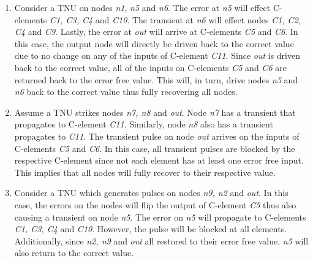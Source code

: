 \begin{enumerate}
	\item Consider a TNU on nodes \textit{n1}, \textit{n5} and \textit{n6}. The error at \textit{n5} will effect C-elements \textit{C1, C3, C4} and \textit{C10}. The transient at \textit{n6} will effect nodes \textit{C1, C2, C4} and \textit{C9}. Lastly, the error at \textit{out} will arrive at C-elements \textit{C5} and \textit{C6}. In this case, the output node will directly be driven back to the correct value due to no change on any of the inputs of C-element \textit{C11}. Since \textit{out} is driven back to the correct value, all of the inputs on C-elements \textit{C5} and \textit{C6} are returned back to the error free value. This will, in turn, drive nodes \textit{n5} and \textit{n6} back to the correct value thus fully recovering all nodes.
	
	\item Assume a TNU strikes nodes \textit{n7, n8} and \textit{out}. Node \textit{n7} has a transient that propagates to C-element \textit{C11}. Similarly, node \textit{n8} also has a transient propagates to \textit{C11}. The transient pulse on node \textit{out} arrives on the inputs of C-elements \textit{C5} and \textit{C6}. In this case, all transient pulses are blocked by the respective C-element since not each element has at least one error free input. This implies that all nodes will fully recover to their respective value.
	
	\item Consider a TNU which generates pulses on nodes \textit{n9, n2} and \textit{out}. In this case, the errors on the nodes will flip the output of C-element \textit{C5} thus also causing a transient on node \textit{n5}. The error on \textit{n5} will propagate to C-elements \textit{C1, C3, C4} and \textit{C10}. However, the pulse will be blocked at all elements. Additionally, since \textit{n2, n9} and \textit{out} all restored to their error free value, \textit{n5} will also return to the correct value.
\end{enumerate}

